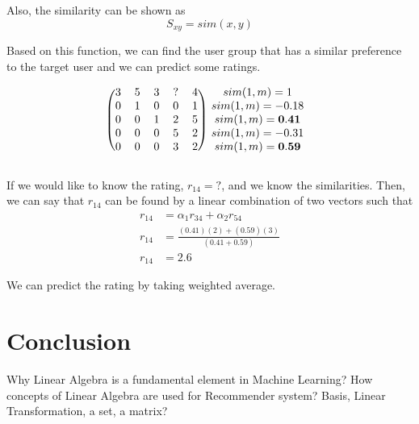 \documentclass[paper=a4, fontsize=12pt]{scrartcl} %
\numberwithin{equation}{section} %
\numberwithin{figure}{section} %
\numberwithin{table}{section} %
\begin{document}
  Also, the similarity can be shown as
  \[
    S_{xy} = sim(x,y)
  \]

  Based on this function, we can find the user group that has a similar
  preference to the target user and we can predict some ratings.

  \[
    \begin{blockarray}{cccccc}
      \begin{block}{(ccccc)c}
        3 & 5 & 3 & \mathbf{?} & 4 & sim(1,m) = 1 \\
        0 & 1 & 0 & 0 & 1 & sim(1,m) = -0.18 \\
        0 & 0 & 1 & 2 & 5 & sim(1,m) = \mathbf{0.41} \\
        0 & 0 & 0 & 5 & 2 & sim(1,m) = -0.31 \\
        0 & 0 & 0 & 3 & 2 & sim(1,m) = \mathbf{0.59} \\
      \end{block}
    \end{blockarray}
  \]

  If we would like to know the rating, \(r_{14} = ?\), and we know the
  similarities. Then, we can say that \(r_{14}\) can be found by a linear
  combination of two vectors such that
  \[
    \begin{split}
      r_{14} & = \alpha_1 r_{34} + \alpha_2 r_{54} \\
      r_{14} & = \frac{(0.41)(2) + (0.59)(3)}{(0.41 + 0.59)} \\
      r_{14} & = 2.6
    \end{split}
  \]

  We can predict the rating by taking weighted average.


  \section{Conclusion}

  Why Linear Algebra is a fundamental element in Machine Learning? How concepts of
  Linear Algebra are used for Recommender system?
  Basis, Linear Transformation, a set, a matrix?

\end{document}
